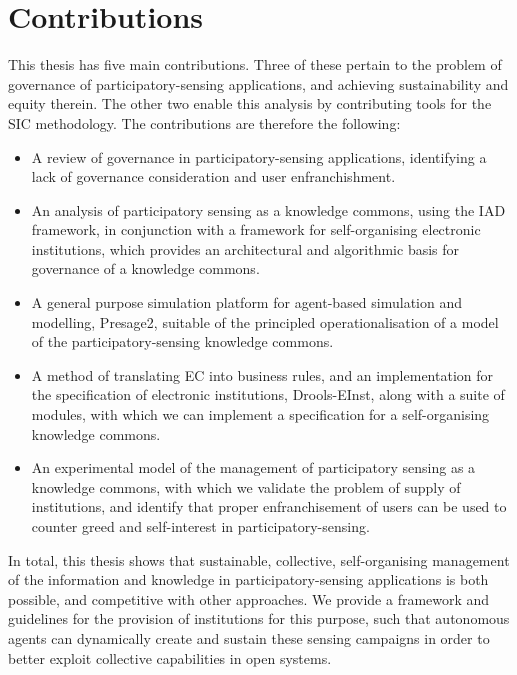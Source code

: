 \section{Contributions}

This thesis has five main contributions. Three of these pertain to the problem of governance of participatory-sensing applications, and achieving sustainability and equity therein. The other two enable this analysis by contributing tools for the \ac{SIC} methodology. The contributions are therefore the following:

\begin{itemize}
\item A review of governance in participatory-sensing applications, identifying a lack of governance consideration and user enfranchishment.
\item An analysis of participatory sensing as a knowledge commons, using the \ac{IAD} framework, in conjunction with a framework for self-organising electronic institutions, which provides an architectural and algorithmic basis for governance of a knowledge commons.
\item A general purpose simulation platform for agent-based simulation and modelling, Presage2, suitable of the principled operationalisation of a model of the participatory-sensing knowledge commons.
\item A method of translating \acl{EC} into business rules, and an implementation for the specification of electronic institutions, Drools-EInst, along with a suite of modules, with which we can implement a specification for a self-organising knowledge commons.
\item An experimental model of the management of participatory sensing as a knowledge commons, with which we validate the problem of supply of institutions, and identify that proper enfranchisement of users can be used to counter greed and self-interest in participatory-sensing.
\end{itemize}

In total, this thesis shows that sustainable, collective, self-organising
management of the information and knowledge in participatory-sensing
applications is both possible, and competitive with other approaches. We
provide a framework and guidelines for the provision of institutions for this
purpose, such that autonomous agents can dynamically create and sustain these
sensing campaigns in order to better exploit collective capabilities in open
systems.

